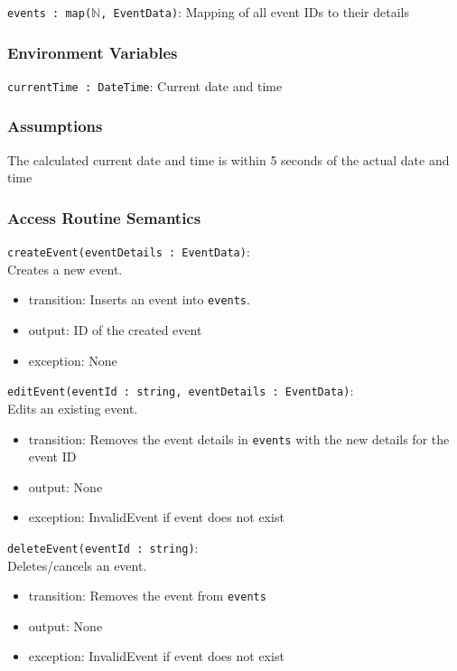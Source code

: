 \documentclass[12pt, titlepage]{article}
\begin{document}
\texttt{events : map($\mathbb{N}$, EventData)}: Mapping of all event IDs to their details

\subsubsection{Environment Variables}

\texttt{currentTime : DateTime}: Current date and time

\subsubsection{Assumptions}

The calculated current date and time is within 5 seconds of the actual date and time

\subsubsection{Access Routine Semantics}

\noindent \texttt{createEvent(eventDetails : EventData)}: \\
Creates a new event.
\begin{itemize}
\item transition: Inserts an event into \texttt{events}.
\item output: ID of the created event
\item exception: None
\end{itemize}

\noindent \texttt{editEvent(eventId : string, eventDetails : EventData)}:\\
Edits an existing event.
\begin{itemize}
\item transition: Removes the event details in \texttt{events} with the new details for the event ID
\item output: None
\item exception: InvalidEvent if event does not exist
\end{itemize}

\noindent \texttt{deleteEvent(eventId : string)}:\\
Deletes/cancels an event.
\begin{itemize}
\item transition: Removes the event from \texttt{events}
\item output: None
\item exception: InvalidEvent if event does not exist
\end{itemize}
\end{document}
